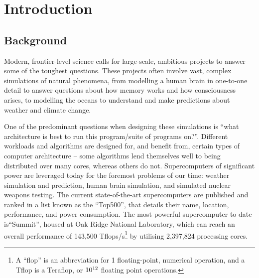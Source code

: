 \documentclass[conference]{IEEEtran}
\begin{document}
\section{Introduction}
\label{sec:introduction}

\subsection{Background}

Modern, frontier-level science calls for large-scale, ambitious projects to answer some of the toughest questions. These projects often involve vast, complex simulations of natural phenomena, from modelling a human brain in one-to-one detail to answer questions about how memory works and how consciousness arises, to modelling the oceans to understand and make predictions about weather and climate change.

One of the predominant questions when designing these simulations is ``what architecture is best to run this program/suite of programs on?''. Different workloads and algorithms are designed for, and benefit from, certain types of computer architecture – some algorithms lend themselves well to being distributed over many cores, whereas others do not. Supercomputers of significant power are leveraged today for the foremost problems of our time: weather simulation and prediction\cite{metoffice}, human brain simulation\cite{humanbrain}, and simulated nuclear weapons testing\cite{nuclear}. The current state-of-the-art supercomputers are published and ranked in a list known as the ``Top500”\cite{top500}, that details their name, location, performance, and power consumption. The most powerful supercomputer to date is``Summit”, housed at Oak Ridge National Laboratory, which can reach an overall performance of 143,500 Tflops/s\footnote{A ``flop” is an abbreviation for 1 floating-point, numerical operation, and a Tflop is a Teraflop, or $10\textsuperscript{12}$ floating point operations.} by utilising 2,397,824 processing cores.
\end{document}
